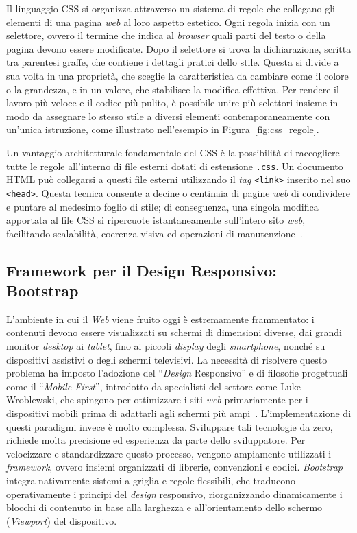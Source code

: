 Il linguaggio CSS si organizza attraverso un sistema di regole che collegano gli elementi di una pagina \textit{web} al loro aspetto estetico. Ogni regola inizia con un selettore, ovvero il termine che indica al \textit{browser} quali parti del testo o della pagina devono essere modificate. Dopo il selettore si trova la dichiarazione, scritta tra parentesi graffe, che contiene i dettagli pratici dello stile. Questa si divide a sua volta in una proprietà, che sceglie la caratteristica da cambiare come il colore o la grandezza, e in un valore, che stabilisce la modifica effettiva. Per rendere il lavoro più veloce e il codice più pulito, è possibile unire più selettori insieme in modo da assegnare lo stesso stile a diversi elementi contemporaneamente con un'unica istruzione\autocite{CascadingStyleSheets}, come illustrato nell'esempio in Figura~\ref{fig:css_regole}.

Un vantaggio architetturale fondamentale del CSS è la possibilità di raccogliere tutte le regole all'interno di file esterni dotati di estensione \texttt{.css}. Un documento HTML può collegarsi a questi file esterni utilizzando il \textit{tag} \texttt{<link>} inserito nel suo \texttt{<head>}. Questa tecnica consente a decine o centinaia di pagine \textit{web} di condividere e puntare al medesimo foglio di stile; di conseguenza, una singola modifica apportata al file CSS si ripercuote istantaneamente sull'intero sito \textit{web}, facilitando scalabilità, coerenza visiva ed operazioni di manutenzione~\autocite[ch. 11]{niederstrobbinsLearningWebDesign2025}.


\subsection{Framework per il Design Responsivo: Bootstrap}
L'ambiente in cui il \textit{Web} viene fruito oggi è estremamente frammentato: i contenuti devono essere visualizzati su schermi di dimensioni diverse, dai grandi monitor \textit{desktop} ai \textit{tablet}, fino ai piccoli \textit{display} degli \textit{smartphone}, nonché su dispositivi assistivi o degli schermi televisivi. La necessità di risolvere questo problema ha imposto l'adozione del ``\textit{Design} Responsivo'' e di filosofie progettuali come il ``\textit{Mobile First}'', introdotto da specialisti del settore come Luke Wroblewski, che spingono per ottimizzare i siti \textit{web} primariamente per i dispositivi mobili prima di adattarli agli schermi più ampi~\autocite[ch. 3]{niederstrobbinsLearningWebDesign2025}.
L’implementazione di questi paradigmi invece è molto complessa. Sviluppare tali tecnologie da zero, richiede molta precisione ed esperienza da parte dello sviluppatore. Per velocizzare e standardizzare questo processo, vengono ampiamente utilizzati i \textit{framework}, ovvero insiemi organizzati di librerie, convenzioni e codici. \textit{Bootstrap}~\autocite{GetStartedBootstrap} integra nativamente sistemi a griglia e regole flessibili, che traducono operativamente i principi del \textit{design} responsivo, riorganizzando dinamicamente i blocchi di contenuto in base alla larghezza e all'orientamento dello schermo (\textit{Viewport}) del dispositivo. 

